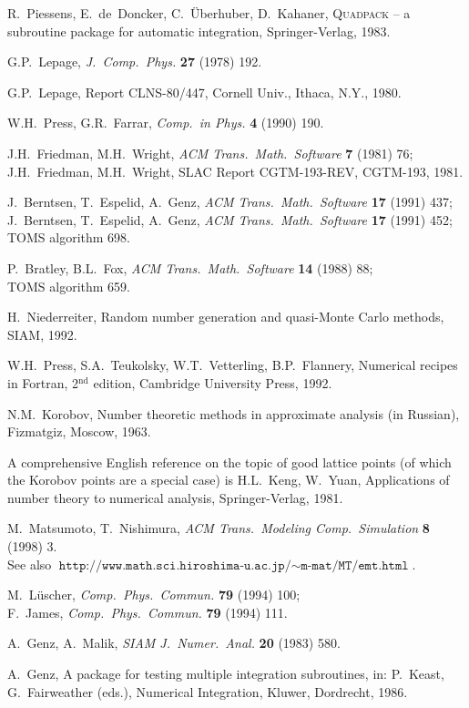 \documentclass[12pt]{article}
\newcommand\Code[1]{\ensuremath{\texttt{#1}}}
\begin{document}
\begin{thebibliography}{99}

\newcommand{\volyearpage}[3]{\textbf{#1} (#2) #3}
\newcommand{\cpc}{\textsl{Comp.\ Phys.\ Commun.} \volyearpage}
\newcommand{\jpc}{\textsl{J.\ Comp.\ Phys.} \volyearpage}
\newcommand{\cip}{\textsl{Comp.\ in Phys.} \volyearpage}
\newcommand{\toms}{\textsl{ACM Trans.\ Math.\ Software} \volyearpage}
\newcommand{\tomacs}{\textsl{ACM Trans.\ Modeling Comp.\ Simulation} \volyearpage}
\newcommand{\siam}{\textsl{SIAM J.\ Numer.\ Anal.} \volyearpage}
\newcommand{\numa}{\textsl{Numer.\ Math.} \volyearpage}

R.~Piessens, E.~de~Doncker, C.~\"Uberhuber, D.~Kahaner,
\textsc{Quadpack} -- a subroutine package for automatic integration,
Springer-Verlag, 1983.

G.P.~Lepage, \jpc{27}{1978}{192}.

G.P.~Lepage, Report CLNS-80/447, Cornell Univ., Ithaca, N.Y., 1980.

W.H.~Press, G.R.~Farrar, \cip{4}{1990}{190}.

J.H.~Friedman, M.H.~Wright, \toms{7}{1981}{76}; \\
J.H.~Friedman, M.H.~Wright, SLAC Report CGTM-193-REV, CGTM-193, 1981.

J.~Berntsen, T.~Espelid, A.~Genz, \toms{17}{1991}{437}; \\
J.~Berntsen, T.~Espelid, A.~Genz, \toms{17}{1991}{452}; \\
TOMS algorithm 698.

P.~Bratley, B.L.~Fox, \toms{14}{1988}{88}; \\
TOMS algorithm 659.

H.~Niederreiter, Random number generation and quasi-Monte Carlo methods,
SIAM, 1992.

W.H.~Press, S.A.~Teukolsky, W.T.~Vetterling, B.P.~Flannery, Numerical 
recipes in Fortran, 2$^{\text{nd}}$ edition, Cambridge University Press, 
1992.

N.M.~Korobov, Number theoretic methods in approximate analysis
(in Russian), Fizmatgiz, Moscow, 1963.

A comprehensive English reference on the topic of good lattice points
(of which the Korobov points are a special case) is H.L.~Keng, W.~Yuan,
Applications of number theory to numerical analysis, Springer-Verlag,
1981.

M.~Matsumoto, T.~Nishimura, \tomacs{8}{1998}{3}. \\
See also 
\Code{http://www.math.sci.hiroshima-u.ac.jp/$\sim$m-mat/MT/emt.html}.

M.~L\"uscher, \cpc{79}{1994}{100}; \\
F.~James, \cpc{79}{1994}{111}.

A.~Genz, A.~Malik, \siam{20}{1983}{580}.

A.~Genz, A package for testing multiple integration subroutines, in: 
P.~Keast, G.~Fairweather (eds.), Numerical Integration, Kluwer,
Dordrecht, 1986.

\end{thebibliography}
\end{document}
